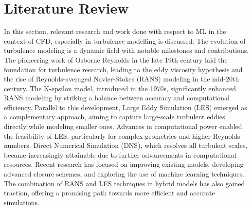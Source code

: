 \section{Literature Review}
In this section, relevant research and work done with respect to ML in the context of CFD, especially in turbulence modelling is discussed. The evolution of turbulence modeling is a dynamic field with notable milestones and contributions. The pioneering work of Osborne Reynolds in the late 19th century laid the foundation for turbulence research, leading to the eddy viscosity hypothesis and the rise of Reynolds-averaged Navier-Stokes (RANS) modeling in the mid-20th century. The K-epsilon model, introduced in the 1970s, significantly enhanced RANS modeling by striking a balance between accuracy and computational efficiency. Parallel to this development, Large Eddy Simulation (LES) emerged as a complementary approach, aiming to capture large-scale turbulent eddies directly while modeling smaller ones. Advances in computational power enabled the feasibility of LES, particularly for complex geometries and higher Reynolds numbers. Direct Numerical Simulation (DNS), which resolves all turbulent scales, became increasingly attainable due to further advancements in computational resources. Recent research has focused on improving existing models, developing advanced closure schemes, and exploring the use of machine learning techniques. The combination of RANS and LES techniques in hybrid models has also gained traction, offering a promising path towards more efficient and accurate simulations. \\
